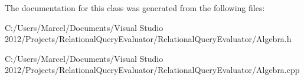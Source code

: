 The documentation for this class was generated from the following files\+:\begin{DoxyCompactItemize}
\item 
C\+:/\+Users/\+Marcel/\+Documents/\+Visual Studio 2012/\+Projects/\+Relational\+Query\+Evaluator/\+Relational\+Query\+Evaluator/Algebra.\+h\item 
C\+:/\+Users/\+Marcel/\+Documents/\+Visual Studio 2012/\+Projects/\+Relational\+Query\+Evaluator/\+Relational\+Query\+Evaluator/Algebra.\+cpp\end{DoxyCompactItemize}
